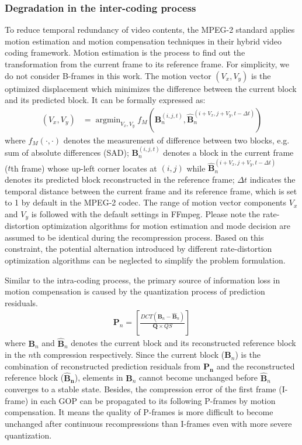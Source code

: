 \documentclass[journal,sort]{IEEEtran}
\begin{document}
\subsubsection{Degradation in the inter-coding process \label{degrad-inter}}
To reduce temporal redundancy of video contents, the MPEG-2 standard applies motion estimation and motion compensation techniques in their hybrid video coding framework. Motion estimation is the process to find out the transformation from the current frame to its reference frame. For simplicity, we do not consider B-frames in this work. The motion vector $(V_x, V_y)$ is the optimized displacement which minimizes the difference between the current block and its predicted block. It can be formally expressed as:
\begin{equation}
\begin{aligned}
(V_x, V_y) & = \mathop{\arg min}_{V_x, V_y}f_M\left(\mathbf{B}_n^{(i,j,t)}, \mathbf{\hat{B}}_n^{(i+V_x, j+V_y,t-\Delta t)}\right)
\label{motion-comp}
\end{aligned}
\end{equation}
where $f_M(\cdot,\cdot)$ denotes the measurement of difference between two blocks, e.g. sum of absolute differences (SAD); $\mathbf{B}_n^{(i,j,t)}$ denotes a block in the current frame ($t$th frame) whose up-left corner locates at $(i,j)$ while $\mathbf{\hat{B}}_n^{(i+V_x, j+V_y,t-\Delta t)}$ denotes its predicted block reconstructed in the reference frame; $\Delta t$ indicates the temporal distance between the current frame and its reference frame, which is set to 1 by default in the MPEG-2 codec. The range of motion vector components $V_x$ and $V_y$ is followed with the default settings in FFmpeg\cite{FFmpeg}. Please note the rate-distortion optimization algorithms for motion estimation and mode decision are assumed to be identical during the recompression process. Based on this constraint, the potential alternation introduced by different rate-distortion optimization algorithms can be neglected to simplify the problem formulation.

Similar to the intra-coding process, the primary source of information loss in motion compensation is caused by the quantization process of prediction residuals.
\begin{equation}
\begin{aligned}
\mathbf{P}_n = \left[ \frac{DCT(\mathbf{B}_n -\mathbf{\hat{B}}_n)}{\mathbf{Q}\times QS}\right]
\label{resi-quan}
\end{aligned}
\end{equation}
where $\mathbf{B}_n$ and $\mathbf{\hat{B}}_n$ denotes the current block and its reconstructed reference block in the $n$th compression respectively. Since the current block ($\mathbf{B}_n$) is the combination of reconstructed prediction residuals from $\mathbf{P_n}$ and the reconstructed reference block ($\mathbf{\hat{B}_n}$), elements in $\mathbf{B}_n$ cannot become unchanged before $\mathbf{\hat{B}}_n$ converges to a stable state. Besides, the compression error of the first frame (I-frame) in each GOP can be propagated to its following P-frames by motion compensation. It means the quality of P-frames is more difficult to become unchanged after continuous recompressions than I-frames even with more severe quantization. 
\end{document}
